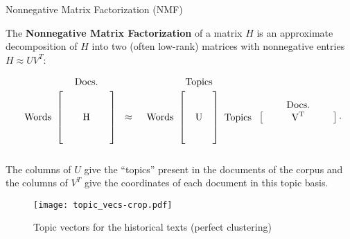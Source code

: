 \documentclass[final]{beamer}
\newlength{\onecolwid}
\begin{document}
\begin{frame}[t]
\begin{columns}[t]
\begin{column}{\onecolwid}
\begin{block}{Nonnegative Matrix Factorization (NMF)}

The \textbf{Nonnegative Matrix Factorization} of a matrix $H$ is an approximate decomposition of $H$ into two (often low-rank) matrices with nonnegative entries $H\approx UV^T$:

\begin{equation*}
\begin{blockarray}{ccccc}
	& & \text{Docs.} & & \\
	\begin{block}{c[ccc]c}
		& & & & \\
		& & & & \\
		\text{Words} & & \text{H} & & ~\approx \\
		& & & & \\
		& & & & \\
	\end{block}
\end{blockarray}
\begin{blockarray}{cc}
	& \text{Topics} \\
	\begin{block}{c[c]}
		& \\
		& \\
		\text{Words} & \text{U} \\
		& \\
		& \\
	\end{block}
\end{blockarray}
\begin{blockarray}{cccccc}
	& & & \text{Docs.} & & \\
	\begin{block}{c[ccccc]}
		\text{Topics} & & & \text{V}^{\text{T}} & & \\
	\end{block}
\end{blockarray}.
\end{equation*}
The columns of $U$ give the ``topics'' present in the documents of the corpus and the columns of $V^T$ give the coordinates of each document in this topic basis.

\vskip 0.5cm
\begin{figure}
\texttt{[image: topic\_vecs-crop.pdf]}
\caption{Topic vectors for the historical texts (perfect clustering)}
\end{figure}


\end{block}
\end{column}
\end{columns}
\end{frame}
\end{document}

